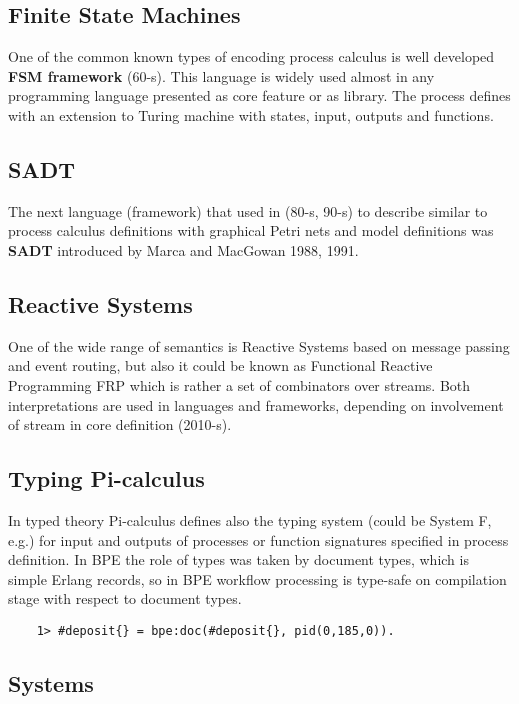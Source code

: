 \subsection{Finite State Machines}
One of the common known types of encoding process calculus is well developed {\bf FSM framework} (60-s).
This language is widely used almost in any programming language presented as core
feature or as library. The process defines with an extension to Turing machine
with states, input, outputs and functions.

\subsection{SADT}
The next language (framework) that used in (80-s, 90-s) to describe similar
to process calculus definitions with graphical Petri nets and model definitions
was {\bf SADT} introduced by Marca and MacGowan 1988, 1991.

\subsection{Reactive Systems}
One of the wide range of semantics is Reactive Systems based on message passing
and event routing, but also it could be known as Functional Reactive Programming FRP
which is rather a set of combinators over streams. Both interpretations are
used in languages and frameworks, depending on involvement of stream in core
definition (2010-s).

\subsection{Typing Pi-calculus}
In typed theory Pi-calculus defines also the typing system (could be System F, e.g.) for
input and outputs of processes or function signatures specified in process definition.
In BPE the role of types was taken by document types, which is simple Erlang records,
so in BPE workflow processing is type-safe on compilation stage with respect to document types.

\vspace{1\baselineskip}
\begin{lstlisting}
    1> #deposit{} = bpe:doc(#deposit{}, pid(0,185,0)).
\end{lstlisting}

\subsection{Systems}

